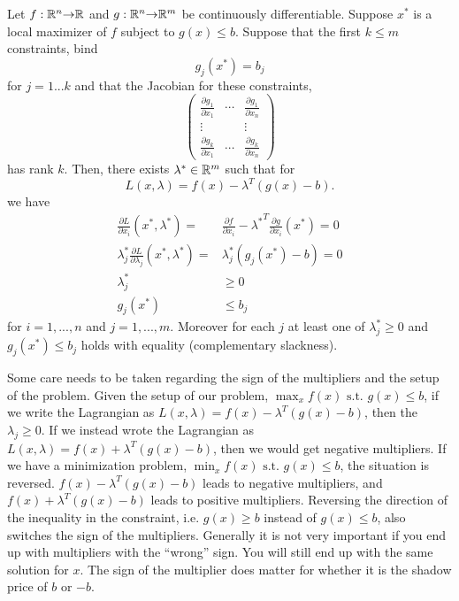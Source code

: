 \begin{theorem} \label{thm:icon} 
  Let $f:\mathbb{R}^n {\rightarrow} \mathbb{R}$ and $g: \mathbb{R}^n {\rightarrow} \mathbb{R}^m$ be continuously
  differentiable. Suppose $x^*$ is a local maximizer of $f$ subject to 
  $g(x) \leq b$. Suppose that the first $k \leq m$ constraints, bind
  \[ g_j(x^*) = b_j \]
  for $j = 1 ... k$ and that the Jacobian for these constraints, 
  \[ \begin{pmatrix} 
    \frac{\partial g_1}{\partial x_1} &  \cdots &\frac{\partial g_1}{\partial x_n}  \\
    \vdots & & \vdots \\
    \frac{\partial g_k}{\partial x_1} &  \cdots &\frac{\partial g_k}{\partial x_n}  
  \end{pmatrix}
  \]
  has rank $k$. Then, there exists
  $\lambda^* \in \mathbb{R}^m$ such that for
  \[ L(x,\lambda) = f(x) - \lambda^T (g(x) - b). \]
  we have
  \begin{align*}
    \frac{\partial L}{\partial x_i}(x^*,\lambda^*) = & \frac{\partial
      f}{\partial x_i} - {\lambda^*}^T \frac{\partial g}{\partial
      x_i}(x^*) = 0 \\
    \lambda_j^* \frac{\partial L}{\partial \lambda_j}(x^*,\lambda^*) =
    & \lambda_j^* \left(g_j(x^*) - b \right)= 0 \\
    \lambda_j^* & \geq 0 \\
    g_j(x^*) & \leq b_j
  \end{align*}
  for $i = 1, ..., n$ and $j=1,...,m$. Moreover for each $j$ at least
  one of $\lambda_j^* \geq 0$ and $g_j(x^*) \leq b_j$ holds with
  equality (complementary slackness).
\end{theorem}
Some care needs to be taken regarding the sign of the multipliers and
the setup of the problem. Given the setup of our problem, $\max_x f(x)
\text{ s.t. } g(x) \leq b$, if we write the Lagrangian as
$L(x,\lambda) = f(x) - \lambda^T (g(x) - b)$, then the $\lambda_j \geq
0$. If we instead wrote the Lagrangian as $L(x,\lambda) = f(x) +
\lambda^T (g(x) - b)$, then we would get negative multipliers. If we
have a minimization problem, $\min_x f(x) \text{ s.t. } g(x) \leq b$,
the situation is reversed. $f(x) - \lambda^T(g(x) - b)$ leads to
negative multipliers, and $f(x) + \lambda^T(g(x) - b)$ leads to
positive multipliers. Reversing the direction of the inequality in the
constraint, i.e. $g(x) \geq b$ instead of $g(x) \leq b$, also switches
the sign of the multipliers.  Generally it is not very important if
you end up with multipliers with the ``wrong'' sign. You will still
end up with the same solution for $x$. The sign of the multiplier does
matter for whether it is the shadow price of $b$ or $-b$. 

